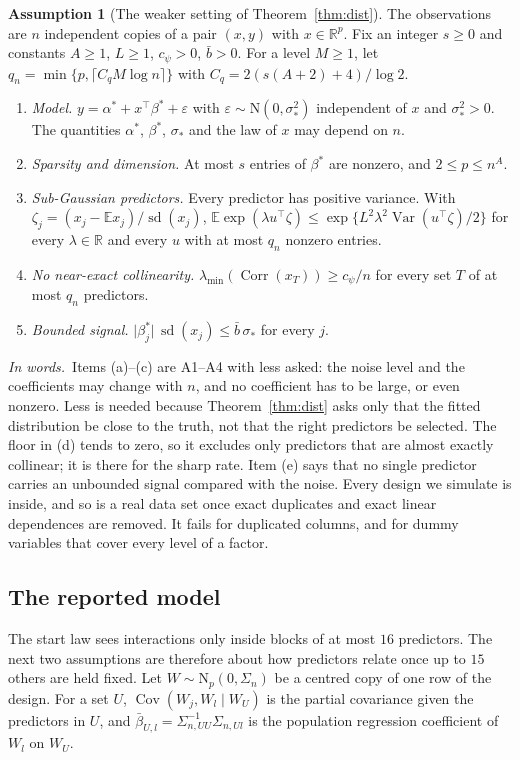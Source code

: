\documentclass[11pt]{article}
\newcommand{\R}{\mathbb{R}}
\newcommand{\E}{\mathbb{E}}
\newcommand{\N}{\mathrm{N}}
\newcommand{\abs}[1]{\lvert #1\rvert}
\newcommand{\Cov}{\operatorname{Cov}}
\newcommand{\Var}{\operatorname{Var}}
\newcommand{\Corr}{\operatorname{Corr}}
\newcommand{\sd}{\operatorname{sd}}
\newcommand{\lmin}{\lambda_{\min}}
\newcommand{\bstar}{\beta^*}
\newcommand{\sigs}{\sigma_*}
\newcommand{\Sig}{\Sigma_n}
\theoremstyle{plain}
\theoremstyle{definition}
\newtheorem{asm}{Assumption}
\newcommand{\words}{\par\smallskip\noindent\textit{In words.}\ }
\begin{document}
\begin{asm}[The weaker setting of Theorem~\ref{thm:dist}]\label{a:dist}
The observations are $n$ independent copies of a pair $(x,y)$ with $x\in\R^p$. Fix an integer $s\ge0$ and constants
$A\ge1$, $L\ge1$, $c_\psi>0$, $\bar b>0$. For a level $M\ge1$, let $q_n=\min\{p,\lceil C_qM\log n\rceil\}$ with
$C_q=2(s(A+2)+4)/\log2$.
\begin{enumerate}[label=(\alph*)]
  \item \emph{Model.} $y=\alpha^*+x^\top\bstar+\varepsilon$ with $\varepsilon\sim\N(0,\sigs^2)$ independent of $x$ and
    $\sigs^2>0$. The quantities $\alpha^*$, $\bstar$, $\sigs$ and the law of $x$ may depend on $n$.
  \item \emph{Sparsity and dimension.} At most $s$ entries of $\bstar$ are nonzero, and $2\le p\le n^A$.
  \item \emph{Sub-Gaussian predictors.} Every predictor has positive variance. With
    $\zeta_j=(x_j-\E x_j)/\sd(x_j)$, $\E\exp(\lambda u^\top\zeta)\le\exp\{L^2\lambda^2\Var(u^\top\zeta)/2\}$ for every
    $\lambda\in\R$ and every $u$ with at most $q_n$ nonzero entries.
  \item \emph{No near-exact collinearity.} $\lmin(\Corr(x_T))\ge c_\psi/n$ for every set $T$ of at most $q_n$ predictors.
  \item \emph{Bounded signal.} $\abs{\beta^*_j}\,\sd(x_j)\le\bar b\,\sigs$ for every $j$.
\end{enumerate}
\end{asm}
\words Items (a)--(c) are A1--A4 with less asked: the noise level and the coefficients may change with $n$, and no
coefficient has to be large, or even nonzero. Less is needed because Theorem~\ref{thm:dist} asks only that the fitted
distribution be close to the truth, not that the right predictors be selected. The floor in (d) tends to zero, so it
excludes only predictors that are almost exactly collinear; it is there for the sharp rate. Item (e) says that no
single predictor carries an unbounded signal compared with the noise. Every design we simulate is inside, and so is a
real data set once exact duplicates and exact linear dependences are removed. It fails for duplicated columns, and for
dummy variables that cover every level of a factor.

\subsection*{The reported model}

The start law sees interactions only inside blocks of at most $16$ predictors. The next two assumptions are therefore
about how predictors relate once up to $15$ others are held fixed. Let $W\sim\N_p(0,\Sig)$ be a centred copy of one row
of the design. For a set $U$, $\Cov(W_j,W_l\mid W_U)$ is the partial covariance given the predictors in $U$, and
$\bar\beta_{U,l}=\Sigma_{n,UU}^{-1}\Sigma_{n,Ul}$ is the population regression coefficient of $W_l$ on $W_U$.
\end{document}
